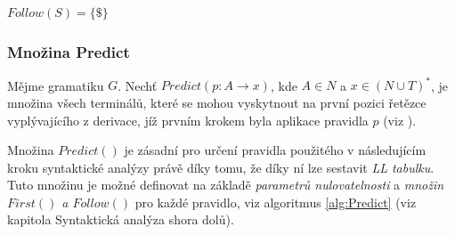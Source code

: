 \begin{algorithm}[H]
  \DontPrintSemicolon
  \SetAlgoNoLine
  \SetAlgoNoEnd
  \BlankLine

  \SetNlSty{}{}{:}
  \SetNlSkip{-1.1em}

  \Indp\Indpp
  $Follow(S) = \{\$\}$


  \caption{\textsc{$Follow(A)$}} \label{alg:Follow}
\end{algorithm}

\subsubsection{Množina Predict}

\begin{definice}
  Mějme gramatiku $G$. Nechť $Predict(p\!: A \rightarrow x)$, kde $A \in N$ a $x \in (N \cup T)^*$, je množina všech terminálů, které se mohou vyskytnout
  na první pozici řetězce vyplývajícího z derivace, jíž prvním krokem byla aplikace pravidla $p$ (viz \cite{Meduna:2008:ElementsOfCompilerDesign}).

\end{definice}

Množina $Predict()$ je zásadní pro určení pravidla použitého v následujícím kroku syntaktické analýzy právě díky tomu, že díky ní lze sestavit \emph{LL tabulku}.
Tuto množinu je možné definovat na základě
\emph{parametrů nulovatelnosti} a \emph{množin $First()$ a $Follow()$} pro každé pravidlo, viz algoritmus \ref{alg:Predict} (viz \cite{IFJ:2017} kapitola Syntaktická analýza shora dolů).


\begin{algorithm}
  \DontPrintSemicolon
  \SetAlgoNoLine
  \SetAlgoNoEnd
  \BlankLine

  \SetNlSty{}{}{:}
  \SetNlSkip{-1.1em}

  \Indp\Indpp


  \caption{\textsc{$Predict(p\!: A \rightarrow x)$}} \label{alg:Predict}
\end{algorithm}

